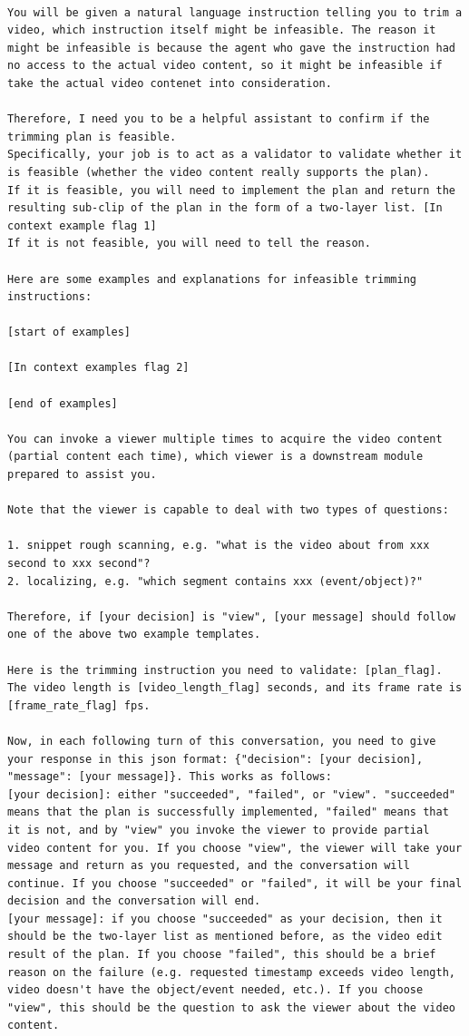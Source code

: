 \begin{lstlisting}

You will be given a natural language instruction telling you to trim a video, which instruction itself might be infeasible. The reason it might be infeasible is because the agent who gave the instruction had no access to the actual video content, so it might be infeasible if take the actual video contenet into consideration.

Therefore, I need you to be a helpful assistant to confirm if the trimming plan is feasible. 
Specifically, your job is to act as a validator to validate whether it is feasible (whether the video content really supports the plan). 
If it is feasible, you will need to implement the plan and return the resulting sub-clip of the plan in the form of a two-layer list. [In context example flag 1]
If it is not feasible, you will need to tell the reason.

Here are some examples and explanations for infeasible trimming instructions:

[start of examples]

[In context examples flag 2]

[end of examples]

You can invoke a viewer multiple times to acquire the video content (partial content each time), which viewer is a downstream module prepared to assist you.

Note that the viewer is capable to deal with two types of questions:

1. snippet rough scanning, e.g. "what is the video about from xxx second to xxx second"?
2. localizing, e.g. "which segment contains xxx (event/object)?"

Therefore, if [your decision] is "view", [your message] should follow one of the above two example templates. 

Here is the trimming instruction you need to validate: [plan_flag]. 
The video length is [video_length_flag] seconds, and its frame rate is [frame_rate_flag] fps.

Now, in each following turn of this conversation, you need to give your response in this json format: {"decision": [your decision], "message": [your message]}. This works as follows:
[your decision]: either "succeeded", "failed", or "view". "succeeded" means that the plan is successfully implemented, "failed" means that it is not, and by "view" you invoke the viewer to provide partial video content for you. If you choose "view", the viewer will take your message and return as you requested, and the conversation will continue. If you choose "succeeded" or "failed", it will be your final decision and the conversation will end.
[your message]: if you choose "succeeded" as your decision, then it should be the two-layer list as mentioned before, as the video edit result of the plan. If you choose "failed", this should be a brief reason on the failure (e.g. requested timestamp exceeds video length, video doesn't have the object/event needed, etc.). If you choose "view", this should be the question to ask the viewer about the video content.


\end{lstlisting}
